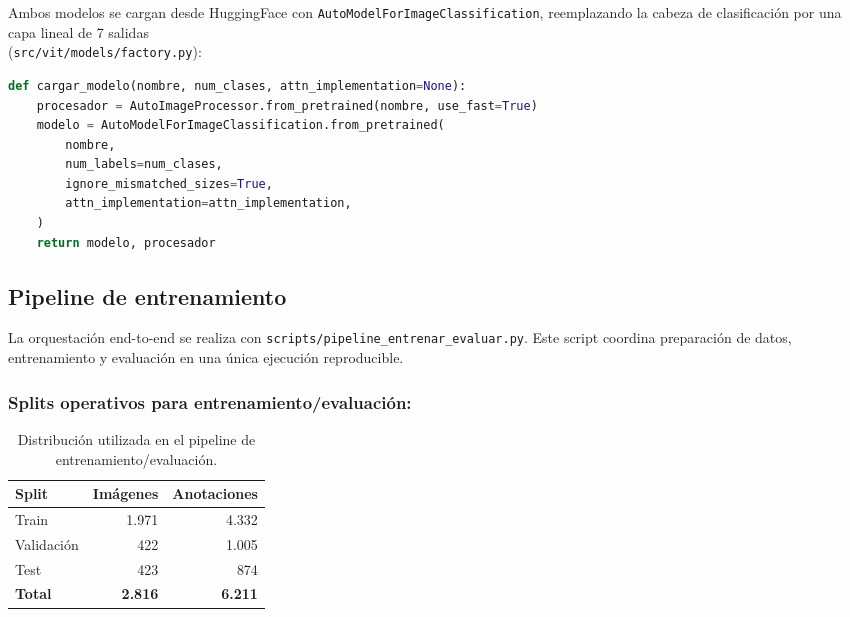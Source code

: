 \documentclass[12pt,a4paper]{article}
\begin{document}
Ambos modelos se cargan desde HuggingFace con \texttt{AutoModelForImageClassification},
reemplazando la cabeza de clasificación por una capa lineal de 7 salidas \\
(\texttt{src/vit/models/factory.py}):

\noindent\begin{minipage}{\linewidth}
\begin{lstlisting}[language=Python, caption={Carga del modelo desde HuggingFace.}]
def cargar_modelo(nombre, num_clases, attn_implementation=None):
    procesador = AutoImageProcessor.from_pretrained(nombre, use_fast=True)
    modelo = AutoModelForImageClassification.from_pretrained(
        nombre,
        num_labels=num_clases,
        ignore_mismatched_sizes=True,
        attn_implementation=attn_implementation,
    )
    return modelo, procesador
\end{lstlisting}
\end{minipage}

\subsection{Pipeline de entrenamiento}

La orquestación end-to-end se realiza con
\texttt{scripts/pipeline\_entrenar\_evaluar.py}. Este script coordina preparación de
datos, entrenamiento y evaluación en una única ejecución reproducible.

\subsubsection{Splits operativos para entrenamiento/evaluación:}
\begin{table}[H]
  \centering
  \begin{tabular}{lrr}
    \toprule
    \textbf{Split} & \textbf{Imágenes} & \textbf{Anotaciones} \\
    \midrule
    Train       & 1.971 & 4.332 \\
    Validación  &   422 & 1.005 \\
    Test        &   423 &   874 \\
    \midrule
    \textbf{Total} & \textbf{2.816} & \textbf{6.211} \\
    \bottomrule
  \end{tabular}
  \caption{Distribución utilizada en el pipeline de entrenamiento/evaluación.}
\end{table}
\end{document}
